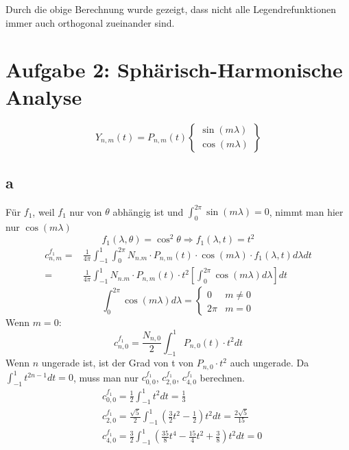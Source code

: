 Durch die obige Berechnung wurde gezeigt, dass nicht alle Legendrefunktionen immer auch orthogonal zueinander sind. 


\clearpage
\section{Aufgabe 2: Sphärisch-Harmonische Analyse}
\begin{equation}
	Y_{n,m}(t) = P_{n,m}(t) \begin{Bmatrix}
	\sin(m\lambda) \\
	\cos(m \lambda)
	\end{Bmatrix}
\end{equation}
\subsection{a}
Für $f_1$, weil $f_1$ nur von $\theta$ abhängig ist und $\int_{0}^{2\pi}\sin(m\lambda) = 0$, nimmt man hier nur $\cos(m\lambda)$
\begin{equation}
	f_1(\lambda,\theta) = \cos^2\theta \Longrightarrow f_1(\lambda,t) = t^2 
\end{equation}
\begin{align}
	c_{n,m}^{f_1} = & \frac{1}{4\pi} \int_{-1}^{1} \int_{0}^{2\pi} N_{n.m} \cdot P_{n,m}(t) \cdot \cos(m\lambda) \cdot f_1(\lambda,t) d\lambda dt \\
	= & \frac{1}{4\pi} \int_{-1}^{1} N_{n.m} \cdot P_{n,m}(t) \cdot t^2  \left[\int_{0}^{2\pi} \cos(m\lambda) d\lambda\right]  dt
\end{align}
\begin{equation}
	\int_{0}^{2\pi} \cos(m\lambda) d\lambda = \begin{cases}
	0 & m \neq 0 \\
	2\pi & m=0
	\end{cases}
\end{equation}
Wenn $m=0$:
\begin{equation}
	c_{n,0}^{f_1} = \frac{N_{n,0}}{2} \int_{-1}^{1} P_{n,0}(t) \cdot t^2 dt
\end{equation}
Wenn $n$ ungerade ist, ist der Grad von t von $P_{n,0}\cdot t^2$ auch ungerade. Da $\int_{-1}^{1} t^{2n-1}dt = 0$, muss man nur $c_{0,0}^{f_1}$, $c_{2,0}^{f_1}$, $c_{4,0}^{f_1}$ berechnen.
\begin{align}
	& c_{0,0}^{f_1} = \frac{1}{2} \int_{-1}^{1} t^2 dt = \frac{1}{3} \\
	& c_{2,0}^{f_1} = \frac{\sqrt{5}}{2} \int_{-1}^{1} (\frac{3}{2}t^2-\frac{1}{2})t^2dt = \frac{2\sqrt{5}}{15} \\
	& c_{4,0}^{f_1} = \frac{3}{2} \int_{-1}^{1} (\frac{35}{8}t^4 - \frac{15}{4}t^2 + \frac{3}{8})t^2dt = 0
\end{align}
